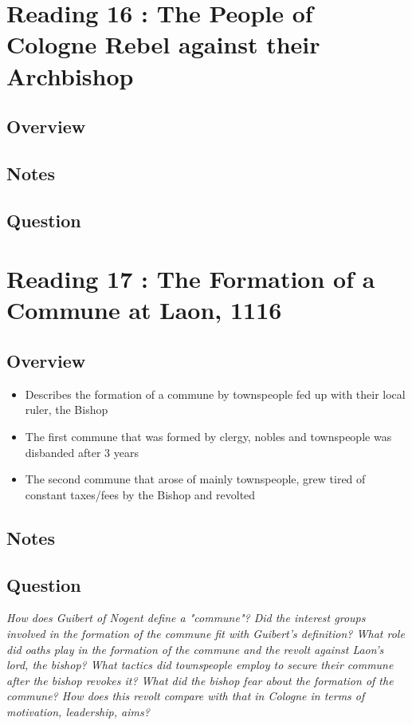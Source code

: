 \documentclass[12pt]{article}
\begin{document}
\section*{Reading 16 : The People of Cologne Rebel against their Archbishop}

\subsection*{Overview}

\subsection*{Notes}

\subsection*{Question}

\section*{Reading 17 : The Formation of a Commune at Laon, 1116}

\subsection*{Overview}
\begin{itemize}
	\item Describes the formation of a commune by townspeople fed up with their local ruler, the Bishop
	\item The first commune that was formed by clergy, nobles and townspeople was disbanded after 3 years
	\item The second commune that arose of mainly townspeople, grew tired of constant taxes/fees by the Bishop and revolted
\end{itemize}

\subsection*{Notes}

\subsection*{Question}

\textit{How does Guibert of Nogent define a "commune"? Did the interest groups involved in the formation of the commune fit with Guibert's definition? What role did oaths play in the formation of the commune and the revolt against Laon's lord, the bishop? What tactics did townspeople employ to secure their commune after the bishop revokes it? What did the bishop fear about the formation of the commune? How does this revolt compare with that in Cologne in terms of motivation, leadership, aims?}
\end{document}

